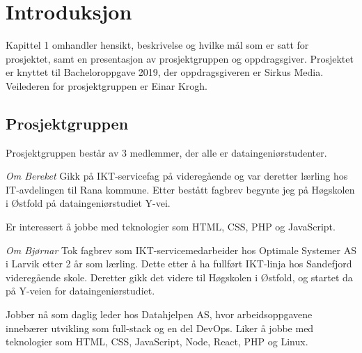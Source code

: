 \cleardoublepage
\chapter{Introduksjon}
\label{chap:intro}
Kapittel 1 omhandler hensikt, beskrivelse og hvilke mål som er satt for prosjektet, samt en presentasjon av prosjektgruppen og oppdragsgiver. Prosjektet er knyttet til Bacheloroppgave 2019, der oppdragsgiveren er Sirkus Media. Veilederen for prosjektgruppen er Einar Krogh. 

\section{Prosjektgruppen}

Prosjektgruppen består av 3 medlemmer, der alle er dataingeniørstudenter.

\textit{Om Bereket}
Gikk på IKT-servicefag på  videregående og var deretter lærling hos IT-avdelingen til Rana kommune. Etter bestått fagbrev begynte jeg på Høgskolen i Østfold på dataingeniørstudiet Y-vei.

Er interessert å jobbe med teknologier som HTML, CSS, PHP og JavaScript.

\textit{Om Bjørnar}
Tok fagbrev som IKT-servicemedarbeider hos Optimale Systemer AS i Larvik etter 2 år som lærling. Dette etter å ha fullført IKT-linja hos Sandefjord videregående skole. Deretter gikk det videre til Høgskolen i Østfold, og startet da på Y-veien for dataingeniørstudiet.

Jobber nå som daglig leder hos Datahjelpen AS, hvor arbeidsoppgavene innebærer utvikling som full-stack og en del DevOps. Liker å jobbe med teknologier som HTML, CSS, JavaScript, Node, React, PHP og Linux.


